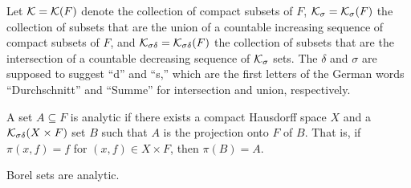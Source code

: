
Let $\mathcal{K} = \mathcal{K}(F)$ denote the collection of compact subsets of $F$, $\mathcal{K}_\sigma = \mathcal{K}_\sigma(F)$ the collection of subsets that are the union of a countable increasing sequence of compact subsets of $F$, and $\mathcal{K}_{\sigma\delta} = \mathcal{K}_{\sigma\delta}(F)$ the collection of subsets that are the intersection of a countable decreasing sequence of $\mathcal{K}_\sigma$ sets. The $\delta$ and $\sigma$ are supposed to suggest ``d'' and ``s,'' which are the first letters of the German words ``Durchschnitt'' and ``Summe'' for intersection and union, respectively.

\begin{definition}\label{def:ch2_2.2}
A set $A \subseteq F$ is analytic if there exists a compact Hausdorff space $X$ and a $\mathcal{K}_{\sigma\delta}(X \times F)$ set $B$ such that $A$ is the projection onto $F$ of $B$. That is, if $\pi(x,f) = f$ for $(x,f) \in X \times F$, then $\pi(B) = A$.
\end{definition}

\begin{proposition}\label{prop:ch2_2.3}
Borel sets are analytic.
\end{proposition}

